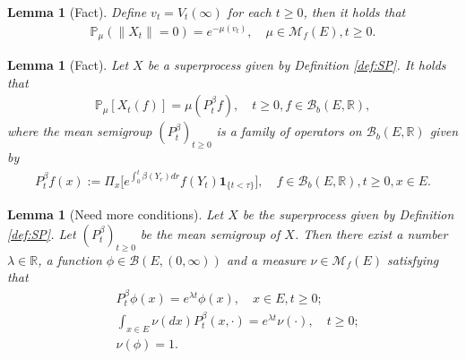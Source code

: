 \documentclass[12pt,a4paper]{amsart}
\numberwithin{equation}{section}
\theoremstyle{plain}
\newtheorem{lem}[thm]{Lemma}
\theoremstyle{definition}
\begin{document}
  \begin{lem}[Fact]
    \label{lem:v}
    Define $v_t = V_t(\infty)$ for each $t\geq 0$, then it holds that 
    \begin{align}
      \mathbb P_\mu (\|X_t\| = 0) 
      = e^{- \mu(v_t)}
      , \quad \mu \in \mathcal M_f(E), t\geq 0.
    \end{align}      
  \end{lem}
  
  \begin{lem}[Fact]
    \label{lem:M}
    Let $X$ be a superprocess given by Definition \ref{def:SP}. 
    It holds that
    \begin{align} 
      \mathbb P_\mu [X_t(f)] = \mu(P^\beta_t f), 
      \quad t \geq 0, f\in \mathcal B_b(E, \mathbb R),
    \end{align} 
    where \emph{the mean semigroup} $(P_t^\beta)_{t\geq 0}$ is a family of operators on $\mathcal B_b(E, \mathbb R)$ given by
    \begin{align}
      P^\beta_tf(x)
      := \Pi_x \big[e^{\int_0^{t} \beta(Y_r)dr} f(Y_t)\mathbf 1_{\{t<\tau\}}\big],
      \quad f \in \mathcal B_b(E, \mathbb R),t\geq 0, x\in E.
    \end{align}
  \end{lem}
\begin{comment}
  \begin{lem}[Fact]
    \label{lem:E}
    Let $X$ be the superprocess given in Definition \ref{def:SP}. 
    Define a function $\psi_0$ on $E\times [0,\infty)$ such that $ \psi_0(x,z)  := \psi(x,z)+ \beta(x) z$ for each  $x\in E$ and  $z \geq 0$.
    Using the monotonicity, extend $\psi$ as a $[0,\infty]$-valued function on $E \times [0,\infty]$ by setting that $\psi(x,\infty) = \lim_{z\uparrow \infty} \psi(x,z)$.
    Define operator $\Psi_0$ on $\mathcal B(E,[0,\infty])$ by $ \Psi_0 g(x):=\psi_0(x, g(x))$.
    Then we have
    \begin{align}
      V_sf+ \int_0^s P_{s-u}^\beta \Psi_0V_u f du = P_s^\beta f,
      \quad s\geq 0, f\in \mathcal B(E, [0,\infty]).
    \end{align}
  \end{lem}
\end{comment}
  \begin{lem}[Need more conditions]
    \label{lem:S}
    Let $X$ be the superprocess given by Definition \ref{def:SP}. 
    Let $(P^\beta_t)_{t\geq 0}$ be the mean semigroup of $X$.
    Then there exist a number $\lambda \in \mathbb R$, a function $\phi \in \mathcal B(E, (0,\infty))$ and a measure $\nu \in \mathcal M_f(E)$ satisfying that
    \begin{align}
      & P_t^\beta \phi(x) 
        = e^{\lambda t} \phi(x),
        \quad x\in E, t\geq 0;
      \\ & \int_{x\in E} \nu(dx) P_t^\beta(x,\cdot) 
           = e^{\lambda t} \nu(\cdot),
           \quad t\geq 0;
      \\ & \nu(\phi) 
           = 1.   
    \end{align}
  \end{lem}
\end{document}
